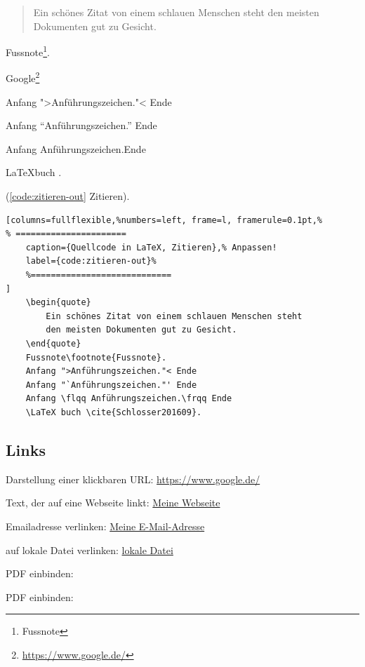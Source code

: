 \begin{quote}
Ein schönes Zitat von einem schlauen Menschen steht den meisten Dokumenten
gut zu Gesicht.
\end{quote}

Fussnote\footnote{Fussnote}.

Google\footnote{\url{https://www.google.de/}}

Anfang ">Anführungszeichen."< Ende

Anfang "`Anführungszeichen."' Ende

Anfang \flqq Anführungszeichen.\frqq Ende

\LaTeX buch \cite{Schlosser201609}.

(\autoref{code:zitieren-out} Zitieren).
\lstset{language=[LaTeX]TeX} %
\begin{lstlisting}[columns=fullflexible,%numbers=left, frame=l, framerule=0.1pt,%
% ======================
	caption={Quellcode in LaTeX, Zitieren},% Anpassen!
	label={code:zitieren-out}%
	%============================
]
	\begin{quote}
		Ein schönes Zitat von einem schlauen Menschen steht 
		den meisten Dokumenten gut zu Gesicht.
	\end{quote}
	Fussnote\footnote{Fussnote}.
	Anfang ">Anführungszeichen."< Ende
	Anfang "`Anführungszeichen."' Ende
	Anfang \flqq Anführungszeichen.\frqq Ende
	\LaTeX buch \cite{Schlosser201609}.
\end{lstlisting}

\newpage

\subsection{Links}\label{sec:links}

Darstellung einer klickbaren URL: \url{https://www.google.de/}

Text, der auf eine Webseite linkt: \href{https://bw1.eu/}{Meine Webseite}

Emailadresse verlinken: \href{mailto:info@bw1.eu}{Meine E-Mail-Adresse}

auf lokale Datei verlinken: \href{run:/word.docx}{lokale Datei} 

PDF einbinden: 

PDF einbinden: \\ 

